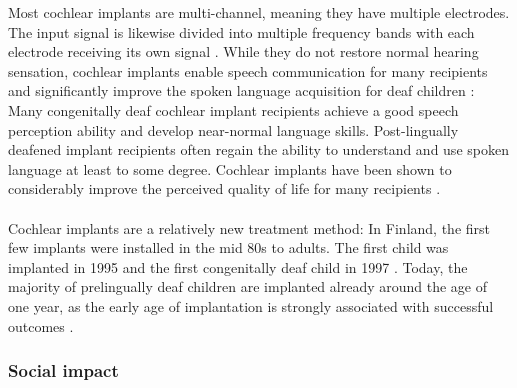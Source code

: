 \documentclass[english, 12pt, a4paper, pdftex, elec, utf8]{aaltothesis}
\begin{document}
Most cochlear implants are multi-channel, meaning they have multiple electrodes. The input signal is likewise divided into multiple frequency bands with each electrode receiving its own signal \cite{moore2007cochlear, friesen2001speech}. While they do not restore normal hearing sensation, cochlear implants enable speech communication for many recipients and significantly improve the spoken language acquisition for deaf children \cite{stacey2006hearing, raino2012sisakorvaistutteen}: Many congenitally deaf cochlear implant recipients achieve a good speech perception ability and develop near-normal language skills. Post-lingually deafened implant recipients often regain the ability to understand and use spoken language at least to some degree. Cochlear implants have been shown to considerably improve the perceived quality of life for many recipients \cite{blomberg2012sisakorvaistutetta}. \\\\
Cochlear implants are a relatively new treatment method: In Finland, the first few implants were installed in the mid 80s to adults. The first child was implanted in 1995 and the first congenitally deaf child in 1997 \cite{raino2012sisakorvaistutteen}. Today, the majority of prelingually deaf children are implanted already around the age of one year, as the early age of implantation is strongly associated with successful outcomes \cite{peterson2010cochlear, stacey2006hearing, raino2012sisakorvaistutteen}.

\subsubsection{Social impact}
\end{document}

